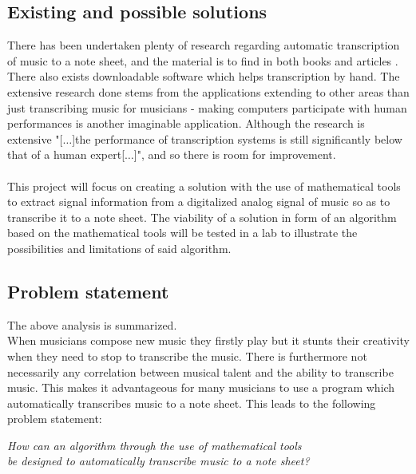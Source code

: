 \subsection{Existing and possible solutions}
There has been undertaken plenty of research regarding automatic transcription of music to a note sheet, and the material is to find in both books \cite{sol1} and articles \cite{sol2}. There also exists downloadable software which helps transcription by hand. \cite{transcribe!} The extensive research done stems from the applications extending to other areas than just transcribing music for musicians - making computers participate with human performances is another imaginable application. Although the research is extensive "[$\ldots$]the performance of transcription systems is still significantly below that of a human expert[$\ldots$]", and so there is room for improvement. \cite{future} \\\\
This project will focus on creating a solution with the use of mathematical tools to extract signal information from a digitalized analog signal of music so as to transcribe it to a note sheet. The viability of a solution in form of an algorithm based on the mathematical tools will be tested in a lab to illustrate the possibilities and limitations of said algorithm. 
\subsection{Problem statement}
The above analysis is summarized.\\
When musicians compose new music they firstly play but it stunts their creativity when they need to stop to transcribe the music. There is furthermore not necessarily any correlation between musical talent and the ability to transcribe music. This makes it advantageous for many musicians to use a program which automatically transcribes music to a note sheet. This leads to the following problem statement:

\begin{center}
\textit{How can an algorithm through the use of mathematical tools \\
be designed to automatically transcribe music to a note sheet?}
\end{center}

